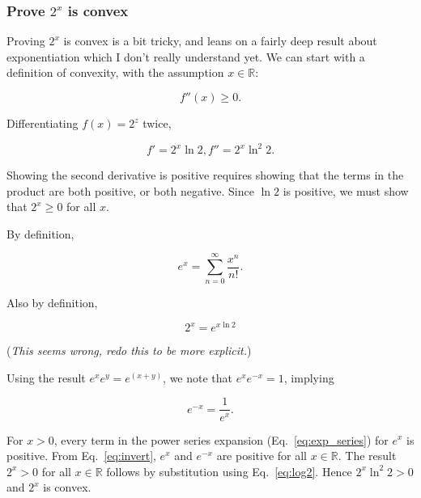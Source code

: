 \documentclass{article}
\begin{document}
\subsubsection{Prove $2^x$ is convex}

Proving $2^x$ is convex is a bit tricky, and leans on a fairly deep result about
exponentiation which I don't really understand yet. We can start with a definition
of convexity, with the assumption $x\in\mathbb{R}$:

\begin{equation}
  f''(x) \geq 0.
\end{equation}

Differentiating $f(x) = 2^z$ twice,

\begin{equation}
  f' = 2^x \ln 2, f'' = 2^x\ln^2 2.
\end{equation}

Showing the second derivative is positive requires showing that the
terms in the product are both positive, or both negative. Since $\ln 2$
is positive, we must show that $2^x \geq 0$ for all $x$.

By definition,

\begin{equation}\label{eq:exp_series}
  e^x = \sum_{n=0}^\infty \frac{x^n}{n!}.
\end{equation}

Also by definition,

\begin{equation}\label{eq:log2}
  2^x = e^{x\ln 2}
\end{equation}

(\textit{This seems wrong, redo this to be more explicit.})

Using the result $e^xe^y = e^{(x+y)}$, we note that $e^xe^{-x} = 1$, implying

\begin{equation}\label{eq:invert}
  e^{-x} = \frac{1}{e^x}.
\end{equation}

For $x > 0$, every term in the power series expansion
(Eq.~\ref{eq:exp_series}) for $e^x$ is positive.
From Eq.~\ref{eq:invert}, $e^x$ and $e^{-x}$ are positive for all $x\in\mathbb{R}$. The result
$2^x > 0$ for all $x\in\mathbb{R}$ follows by substitution using
Eq.~\ref{eq:log2}. Hence $2^x\ln^2 2 > 0$ and $2^x$ is convex.

\begin{comment}
Substituting and expanding:

\begin{equation}
  2^x = 1 + x\ln 2 + \frac{x^2 \ln^2 2}{2!} + \frac{x^3 \ln^3 2}{3!} + \cdots.
\end{equation}

For $x > 0, 2^x$ is clearly positive. For $x = 0, 2^0 = 1$, again positive. When $x < 0$,

\begin{equation}
  2^{-x} = 1 - x\ln 2 + \frac{x^2 \ln^2 2}{2!} - \frac{x^3 \ln^3 2}{3!} + \frac{x^4 \ln^4 2}{4!}
  - \frac{x^5 \ln^5 2}{5!} + \cdots.
\end{equation}
\end{comment}
\end{document}
